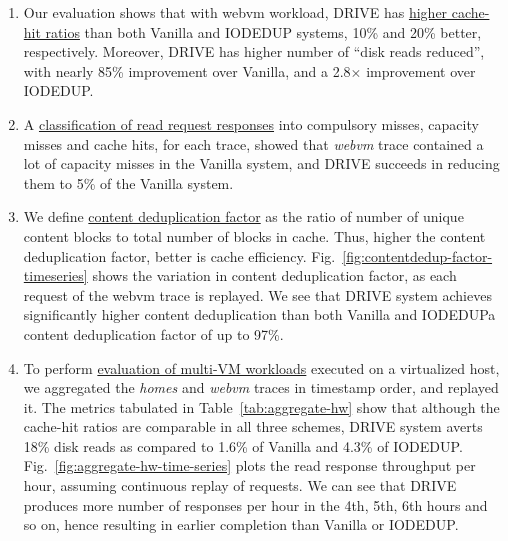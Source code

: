 \begin{enumerate}
	\item Our evaluation shows that with webvm workload,
		DRIVE has \underline{higher cache-hit ratios} than both 
		Vanilla and IODEDUP systems, 10\% and 20\% better, respectively.
		Moreover, DRIVE has higher number of ``disk reads reduced'', with nearly
		85\% improvement over Vanilla, and a 2.8$\times$ improvement over IODEDUP.
	\item A \underline{classification of read request responses} into compulsory misses, capacity misses
		and cache hits, for each trace, showed that \textit{webvm} trace contained a
		lot of capacity misses in the Vanilla system, and DRIVE succeeds in reducing 
		them to 5\% of the Vanilla system.
	\item We define \underline{content deduplication factor} as the ratio of
number of unique content blocks to total number of blocks in cache. Thus, higher the content
deduplication factor, better is cache efficiency. Fig.~\ref{fig:contentdedup-factor-timeseries} 
shows the variation in content deduplication factor, as each request of the webvm trace is replayed. We see that DRIVE system achieves
significantly higher content deduplication than both Vanilla and IODEDUP\textemdash{}a content 
deduplication factor of up to 97\%.
	\item To perform \underline{evaluation of multi-VM workloads} executed on a 
		virtualized host, we aggregated the \textit{homes} and \textit{webvm} 
		traces in timestamp order, and replayed it.
The metrics tabulated in Table~\ref{tab:aggregate-hw} 
show that although the cache-hit ratios are comparable in all
three schemes, DRIVE system averts 18\% disk reads as compared to 1.6\% of Vanilla and 4.3\%
of IODEDUP. Fig.~\ref{fig:aggregate-hw-time-series} 
plots the read response throughput per hour, assuming continuous replay
of requests. We can see that DRIVE produces more number of responses per hour in the 4th,
5th, 6th hours and so on, hence resulting in earlier completion than Vanilla or IODEDUP.
\end{enumerate}


